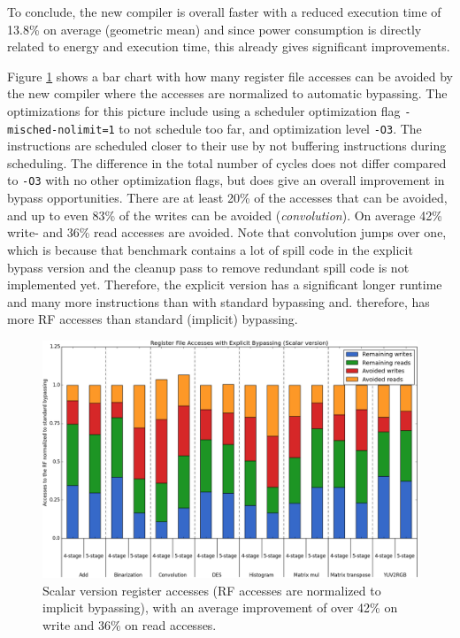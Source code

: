 To conclude, the new compiler is overall faster with a reduced execution time of 13.8\% on average (geometric mean) and since power consumption is directly related to energy and execution time, this already gives significant improvements. 


Figure \ref{fig:scalar_improvements} shows a bar chart with how many register file accesses can be avoided by the new compiler where the accesses are normalized to automatic bypassing. The optimizations for this picture include using a scheduler optimization flag \texttt{-misched-nolimit=1} to not schedule too far, and optimization level \texttt{-O3}. The instructions are scheduled closer to their use by not buffering instructions during scheduling. The difference in the total number of cycles does not differ compared to \texttt{-O3} with no other optimization flags, but does give an overall improvement in bypass opportunities. There are at least 20\% of the accesses that can be avoided, and up to even 83\% of the writes can be avoided (\emph{convolution}). On average 42\% write- and 36\% read accesses are avoided. Note that convolution jumps over one, which is because that benchmark contains a lot of spill code in the explicit bypass version and the cleanup pass to remove redundant spill code is not implemented yet. Therefore, the explicit version has a significant longer runtime and many more instructions than with standard bypassing and. therefore, has more RF accesses than standard (implicit) bypassing. 


\begin{figure}[t!]
\centering
\hspace*{-.12in}
\includegraphics[width=.875\textwidth]{figures/stats/scalar_accesses}
\caption{Scalar version register accesses (RF accesses are normalized to implicit bypassing), with an average improvement of over 42\% on write and 36\% on read accesses.}
\label{fig:scalar_improvements}
\end{figure}

